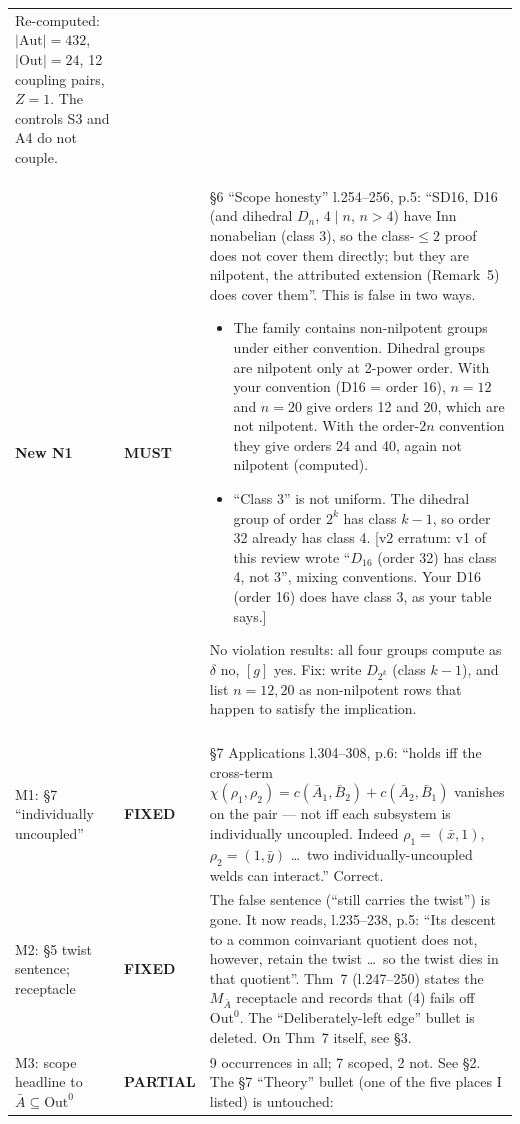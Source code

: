 \documentclass[10pt]{article}
\newcommand{\Out}{\mathrm{Out}}
\newcommand{\Aut}{\mathrm{Aut}}
\newcommand{\Abar}{\bar A}
\newcommand{\st}[1]{\textbf{#1}}
\begin{document}
\begin{longtable}{>{\raggedright}p{2.3cm}>{\raggedright}p{1.4cm}p{12.6cm}}
  Re-computed: $|\Aut|=432$, $|\Out|=24$, 12 coupling pairs, $Z=1$. The controls S3 and A4 do not couple.\\
\textbf{New N1} & \st{MUST} &
  \S6 ``Scope honesty'' l.254--256, p.5: ``SD16, D16 (and dihedral $D_n$, $4\mid n$, $n>4$) have Inn nonabelian (class 3), so the class-$\le2$ proof does not cover them directly; but they are nilpotent, the attributed extension (Remark~5) does cover them''.
  This is false in two ways.
  \begin{itemize}
  \item The family contains non-nilpotent groups under either convention. Dihedral groups are nilpotent only at 2-power order. With your convention (D16 = order 16), $n=12$ and $n=20$ give orders 12 and 20, which are not nilpotent. With the order-$2n$ convention they give orders 24 and 40, again not nilpotent (computed).
  \item ``Class 3'' is not uniform. The dihedral group of order $2^k$ has class $k-1$, so order 32 already has class 4. [v2 erratum: v1 of this review wrote ``$D_{16}$ (order 32) has class 4, not 3'', mixing conventions. Your D16 (order 16) does have class 3, as your table says.]
  \end{itemize}
  No violation results: all four groups compute as $\delta$ no, $[g]$ yes. Fix: write $D_{2^k}$ (class $k-1$), and list $n=12,20$ as non-nilpotent rows that happen to satisfy the implication.\\
\midrule
\multicolumn{3}{l}{\emph{$\delta$ is quadratic (UID 390)}}\\
M1: \S7 ``individually uncoupled'' & \st{FIXED} &
  \S7 Applications l.304--308, p.6: ``holds iff the cross-term $\chi(\rho_1,\rho_2)=c(\bar A_1,\bar B_2)+c(\bar A_2,\bar B_1)$ vanishes on the pair --- not iff each subsystem is individually uncoupled. Indeed $\rho_1=(\bar x,1)$, $\rho_2=(1,\bar y)$ \dots\ two individually-uncoupled welds can interact.'' Correct.\\
M2: \S5 twist sentence; receptacle & \st{FIXED} &
  The false sentence (``still carries the twist'') is gone. It now reads, l.235--238, p.5: ``Its descent to a common coinvariant quotient does not, however, retain the twist \dots\ so the twist dies in that quotient''.
  Thm~7 (l.247--250) states the $M_{\Abar}$ receptacle and records that (4) fails off $\Out^0$. The ``Deliberately-left edge'' bullet is deleted.
  On Thm~7 itself, see \S3.\\
M3: scope headline to $\Abar\subseteq\Out^0$ & \st{PARTIAL} &
  9 occurrences in all; 7 scoped, 2 not. See \S2. The \S7 ``Theory'' bullet (one of the five places I listed) is untouched:

\end{longtable}
\end{document}
